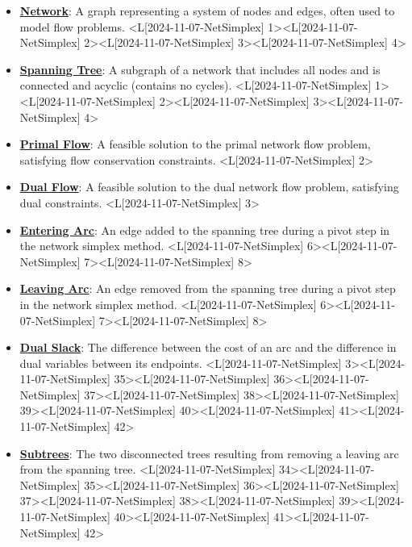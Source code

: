\documentclass{article}%
\begin{document}
\begin{itemize}[[leftmargin=*]]%
\item \href{https://www.math.purdue.edu/~yipn/421/2024-11-07-NetSimplex.pdf#page=1}{\textbf{Network}}: A graph representing a system of nodes and edges, often used to model flow problems. <L[2024-11-07-NetSimplex] 1><L[2024-11-07-NetSimplex] 2><L[2024-11-07-NetSimplex] 3><L[2024-11-07-NetSimplex] 4>%
\item \href{https://www.math.purdue.edu/~yipn/421/2024-11-07-NetSimplex.pdf#page=1}{\textbf{Spanning Tree}}: A subgraph of a network that includes all nodes and is connected and acyclic (contains no cycles). <L[2024-11-07-NetSimplex] 1><L[2024-11-07-NetSimplex] 2><L[2024-11-07-NetSimplex] 3><L[2024-11-07-NetSimplex] 4>%
\item \href{https://www.math.purdue.edu/~yipn/421/2024-11-07-NetSimplex.pdf#page=2}{\textbf{Primal Flow}}: A feasible solution to the primal network flow problem, satisfying flow conservation constraints. <L[2024-11-07-NetSimplex] 2>%
\item \href{https://www.math.purdue.edu/~yipn/421/2024-11-07-NetSimplex.pdf#page=3}{\textbf{Dual Flow}}: A feasible solution to the dual network flow problem, satisfying dual constraints. <L[2024-11-07-NetSimplex] 3>%
\item \href{https://www.math.purdue.edu/~yipn/421/2024-11-07-NetSimplex.pdf#page=6}{\textbf{Entering Arc}}: An edge added to the spanning tree during a pivot step in the network simplex method. <L[2024-11-07-NetSimplex] 6><L[2024-11-07-NetSimplex] 7><L[2024-11-07-NetSimplex] 8>%
\item \href{https://www.math.purdue.edu/~yipn/421/2024-11-07-NetSimplex.pdf#page=6}{\textbf{Leaving Arc}}: An edge removed from the spanning tree during a pivot step in the network simplex method. <L[2024-11-07-NetSimplex] 6><L[2024-11-07-NetSimplex] 7><L[2024-11-07-NetSimplex] 8>%
\item \href{https://www.math.purdue.edu/~yipn/421/2024-11-07-NetSimplex.pdf#page=3}{\textbf{Dual Slack}}: The difference between the cost of an arc and the difference in dual variables between its endpoints. <L[2024-11-07-NetSimplex] 3><L[2024-11-07-NetSimplex] 35><L[2024-11-07-NetSimplex] 36><L[2024-11-07-NetSimplex] 37><L[2024-11-07-NetSimplex] 38><L[2024-11-07-NetSimplex] 39><L[2024-11-07-NetSimplex] 40><L[2024-11-07-NetSimplex] 41><L[2024-11-07-NetSimplex] 42>%
\item \href{https://www.math.purdue.edu/~yipn/421/2024-11-07-NetSimplex.pdf#page=34}{\textbf{Subtrees}}: The two disconnected trees resulting from removing a leaving arc from the spanning tree. <L[2024-11-07-NetSimplex] 34><L[2024-11-07-NetSimplex] 35><L[2024-11-07-NetSimplex] 36><L[2024-11-07-NetSimplex] 37><L[2024-11-07-NetSimplex] 38><L[2024-11-07-NetSimplex] 39><L[2024-11-07-NetSimplex] 40><L[2024-11-07-NetSimplex] 41><L[2024-11-07-NetSimplex] 42>%
\end{itemize}%
\end{document}
